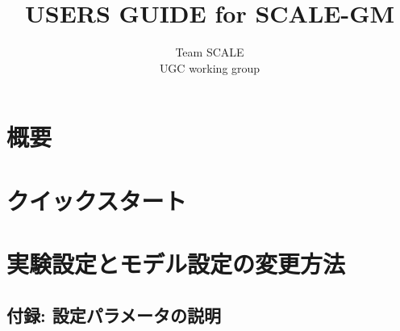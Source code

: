 \documentclass[a4paper]{jreport}
\title{{\Huge USERS GUIDE for SCALE-GM\\
        \vspace{2cm}{\Large Version \version} }}
\author{\Large Team SCALE\\ UGC working group}
\date{\西暦{\today}}
\begin{document}
\maketitle

\clearpage
\tableofcontents

\chapter{概要}\label{chap:overview}


\chapter{クイックスタート}\label{chap:quickstart}


\chapter{実験設定とモデル設定の変更方法}\label{chap:settings}


%

\clearpage


\begin{appendix}
\chapter{付録: 設定パラメータの説明}

\end{appendix}

\end{document}
